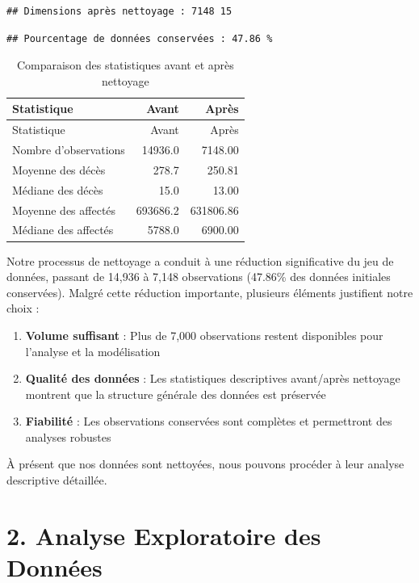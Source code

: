 \documentclass[
]{article}
\begin{document}
\begin{verbatim}
## Dimensions après nettoyage : 7148 15
\end{verbatim}

\begin{verbatim}
## Pourcentage de données conservées : 47.86 %
\end{verbatim}

\begin{longtable}[]{@{}lrr@{}}
\caption{Comparaison des statistiques avant et après
nettoyage}\tabularnewline
\toprule\noalign{}
Statistique & Avant & Après \\
\midrule\noalign{}
\endfirsthead
\toprule\noalign{}
Statistique & Avant & Après \\
\midrule\noalign{}
\endhead
\bottomrule\noalign{}
\endlastfoot
Nombre d'observations & 14936.0 & 7148.00 \\
Moyenne des décès & 278.7 & 250.81 \\
Médiane des décès & 15.0 & 13.00 \\
Moyenne des affectés & 693686.2 & 631806.86 \\
Médiane des affectés & 5788.0 & 6900.00 \\
\end{longtable}

Notre processus de nettoyage a conduit à une réduction significative du
jeu de données, passant de 14,936 à 7,148 observations (47.86\% des
données initiales conservées). Malgré cette réduction importante,
plusieurs éléments justifient notre choix :

\begin{enumerate}
\def\labelenumi{\arabic{enumi}.}
\item
  \textbf{Volume suffisant} : Plus de 7,000 observations restent
  disponibles pour l'analyse et la modélisation
\item
  \textbf{Qualité des données} : Les statistiques descriptives
  avant/après nettoyage montrent que la structure générale des données
  est préservée
\item
  \textbf{Fiabilité} : Les observations conservées sont complètes et
  permettront des analyses robustes
\end{enumerate}

À présent que nos données sont nettoyées, nous pouvons procéder à leur
analyse descriptive détaillée.

\section{2. Analyse Exploratoire des
Données}\label{analyse-exploratoire-des-donnuxe9es}
\end{document}
